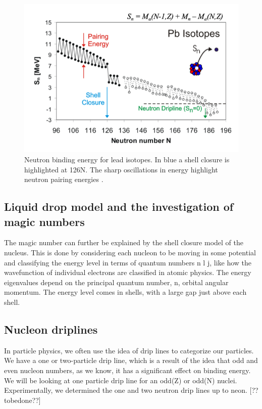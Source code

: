 \begin{figure}[H]
    \centering
    \includegraphics[width=.5\textwidth]{images/MSaNFT_zigzag.png}
    \caption{Neutron binding energy for lead isotopes. In blue a shell closure is highlighted at 126N. The sharp oscillations in energy highlight neutron pairing energies \cite{noauthor_nuclear_nodate}.}\label{fig:MSaNFTzigzag}
\end{figure}

\subsection{Liquid drop model and the investigation of magic numbers}
The magic number can further be explained by the shell closure model of the nucleus.
This is done by considering each nucleon to be moving in some potential and classifying the energy level in terms of quantum numbers n l j, like how the wavefunction of individual electrons are classified in atomic physics.
The energy eigenvalues depend on the principal quantum number, n, orbital angular momentum.
The energy level comes in shells, with a large gap just above each shell. \cite{smolanczuk_particle}

\subsection{Nucleon driplines}
In particle physics, we often use the idea of drip lines to categorize our particles.
We have a one or two-particle drip line, which is a result of the idea that odd and even nucleon numbers, as we know, it has a significant effect on binding energy.
We will be looking at one particle drip line for an odd(Z) or odd(N) nuclei.
Experimentally, we determined the one and two neutron drip lines up to neon. [??tobedone??]